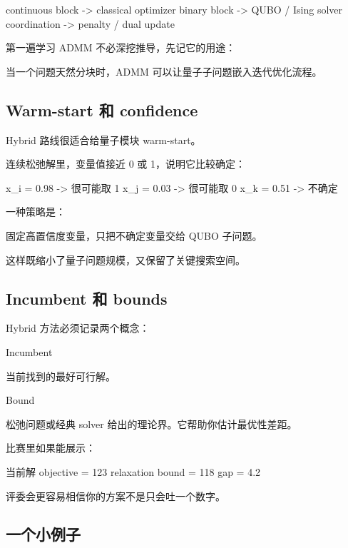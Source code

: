 \documentclass[UTF8,12pt,a4paper]{ctexart}
\begin{document}
\begin{GuideVerbatim}
continuous block -> classical optimizer
binary block     -> QUBO / Ising solver
coordination     -> penalty / dual update
\end{GuideVerbatim}

第一遍学习 ADMM 不必深挖推导，先记它的用途：

\begin{GuideVerbatim}
当一个问题天然分块时，ADMM 可以让量子子问题嵌入迭代优化流程。
\end{GuideVerbatim}

\subsection*{Warm-start 和 confidence}

Hybrid 路线很适合给量子模块 warm-start。

连续松弛解里，变量值接近 0 或 1，说明它比较确定：

\begin{GuideVerbatim}
x_i = 0.98 -> 很可能取 1
x_j = 0.03 -> 很可能取 0
x_k = 0.51 -> 不确定
\end{GuideVerbatim}

一种策略是：

\begin{GuideVerbatim}
固定高置信度变量，只把不确定变量交给 QUBO 子问题。
\end{GuideVerbatim}

这样既缩小了量子问题规模，又保留了关键搜索空间。

\subsection*{Incumbent 和 bounds}

Hybrid 方法必须记录两个概念：

Incumbent

当前找到的最好可行解。

Bound

松弛问题或经典 solver 给出的理论界。它帮助你估计最优性差距。

比赛里如果能展示：

\begin{GuideVerbatim}
当前解 objective = 123
relaxation bound = 118
gap = 4.2%
\end{GuideVerbatim}

评委会更容易相信你的方案不是只会吐一个数字。

\subsection*{一个小例子}
\end{document}
